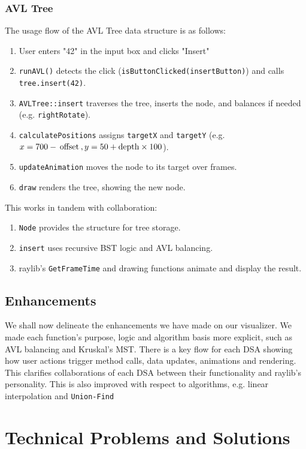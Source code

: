\documentclass{article}
\begin{document}
\subsubsection{AVL Tree}
The usage flow of the AVL Tree data structure is as follows:
\begin{enumerate}
	\item User enters "42" in the input box and clicks "Insert"
	\item \lstinline|runAVL()| detects the click (\lstinline|isButtonClicked(insertButton)|) and calls \lstinline|tree.insert(42)|.
	\item \lstinline|AVLTree::insert| traverses the tree, inserts the node, and balances if needed (e.g. \lstinline|rightRotate|).
	\item \lstinline|calculatePositions| assigns \lstinline|targetX| and \lstinline|targetY| (e.g. $x = 700 - \text{\lstinline|offset|},y = 50 + \text{\lstinline|depth|}\times100$).
	\item \lstinline|updateAnimation| moves the node to its target over frames.
	\item \lstinline|draw| renders the tree, showing the new node.
\end{enumerate}
This works in tandem with collaboration:
\begin{enumerate}
	\item \lstinline|Node| provides the structure for tree storage.
	\item \lstinline|insert| uses recursive BST logic and AVL balancing.
	\item raylib's \lstinline|GetFrameTime| and drawing functions animate and display the result.
\end{enumerate}

\subsection{Enhancements}
We shall now delineate the enhancements we have made on our visualizer. We made each function's purpose, logic and algorithm basis more explicit, such as AVL balancing and Kruskal's MST. There is a key flow for each DSA showing how user actions trigger method calls, data updates, animations and rendering. This clarifies collaborations of each DSA between their functionality and raylib's personality. This is also improved with respect to algorithms, e.g. linear interpolation and \lstinline|Union-Find|

\section{Technical Problems and Solutions}
\end{document}
